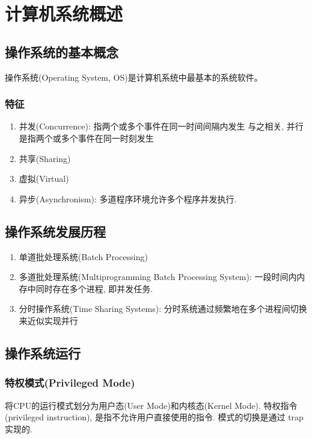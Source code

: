 \section{计算机系统概述}

\subsection{操作系统的基本概念}
操作系统(Operating System, OS)是计算机系统中最基本的系统软件。

\subsubsection{特征}
\begin{enumerate}
    \item 并发(Concurrence): 指两个或多个事件在同一时间间隔内发生
    \subitem 与之相关, 并行是指两个或多个事件在同一时刻发生
    \item 共享(Sharing)
    \item 虚拟(Virtual)
    \item 异步(Asynchronism): 多道程序环境允许多个程序并发执行. 
\end{enumerate}

\subsection{操作系统发展历程}
\begin{enumerate}
    \item 单道批处理系统(Batch Processing)
    \item 多道批处理系统(Multiprogramming Batch Processing System): 一段时间内内存中同时存在多个进程, 即并发任务. 
    \item 分时操作系统(Time Sharing Systems): 分时系统通过频繁地在多个进程间切换来近似实现并行
\end{enumerate}

\subsection{操作系统运行}

\subsubsection{特权模式(Privileged Mode)}
将CPU的运行模式划分为用户态(User Mode)和内核态(Kernel Mode). 特权指令(privileged instruction), 是指不允许用户直接使用的指令. 模式的切换是通过 trap 实现的. 

